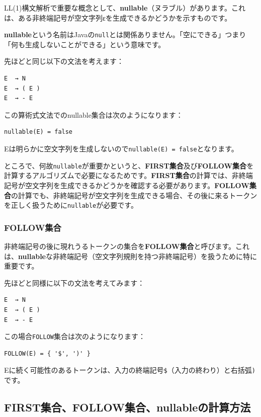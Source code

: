 LL(1)構文解析で重要な概念として、\textbf{nullable}（ヌラブル）があります。これは、ある非終端記号が空文字列εを生成できるかどうかを示すものです。

\textbf{nullable}という名前はJavaの\texttt{null}とは関係ありません。「空にできる」つまり「何も生成しないことができる」という意味です。

先ほどと同じ以下の文法を考えます：

\begin{verbatim}
E  → N
E  → ( E )
E  → - E
\end{verbatim}

この算術式文法でのnullable集合は次のようになります：

\begin{verbatim}
nullable(E) = false
\end{verbatim}

Eは明らかに空文字列を生成しないので\texttt{nullable(E)\ =\ false}となります。

ところで、何故\texttt{nullable}が重要かというと、\textbf{FIRST集合}及び\textbf{FOLLOW集合}を計算するアルゴリズムで必要になるためです。\textbf{FIRST集合}の計算では、非終端記号が空文字列を生成できるかどうかを確認する必要があります。\textbf{FOLLOW集合}の計算でも、非終端記号が空文字列を生成できる場合、その後に来るトークンを正しく扱うために\texttt{nullable}が必要です。

\hypertarget{chapter5-followux96c6ux5408}{%
\subsubsection{FOLLOW集合}\label{chapter5-followux96c6ux5408}}

非終端記号の後に現れうるトークンの集合を\textbf{FOLLOW集合}と呼びます。これは、\textbf{nullable}な非終端記号（空文字列規則を持つ非終端記号）を扱うために特に重要です。

先ほどと同様に以下の文法を考えてみます：

\begin{verbatim}
E  → N
E  → ( E )
E  → - E
\end{verbatim}

この場合\texttt{FOLLOW}集合は次のようになります：

\begin{verbatim}
FOLLOW(E) = { '$', ')' }
\end{verbatim}

Eに続く可能性のあるトークンは、入力の終端記号\texttt{\$}（入力の終わり）と右括弧\texttt{)}です。

\hypertarget{chapter5-firstux96c6ux5408followux96c6ux5408nullableux306eux8a08ux7b97ux65b9ux6cd5}{%
\subsection{FIRST集合、FOLLOW集合、nullableの計算方法}\label{chapter5-firstux96c6ux5408followux96c6ux5408nullableux306eux8a08ux7b97ux65b9ux6cd5}}

